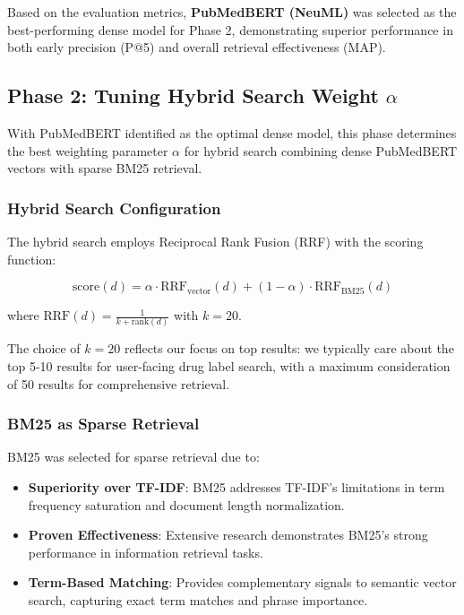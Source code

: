 Based on the evaluation metrics, \textbf{PubMedBERT (NeuML)} was selected as the best-performing dense model for Phase 2, demonstrating superior performance in both early precision (P@5) and overall retrieval effectiveness (MAP).

\subsection{Phase 2: Tuning Hybrid Search Weight \texorpdfstring{$\alpha$}{alpha}}
\label{subsec:phase2-hybrid-tuning}

With PubMedBERT identified as the optimal dense model, this phase determines the best weighting parameter \texorpdfstring{$\alpha$}{alpha} for hybrid search combining dense PubMedBERT vectors with sparse BM25 retrieval.

\subsubsection{Hybrid Search Configuration}
\label{subsubsec:hybrid-configuration}

The hybrid search employs Reciprocal Rank Fusion (RRF) with the scoring function:

\[
    \text{score}(d) = \alpha \cdot \text{RRF}_{\text{vector}}(d) + (1 - \alpha) \cdot \text{RRF}_{\text{BM25}}(d)
\]

where $\text{RRF}(d) = \frac{1}{k + \text{rank}(d)}$ with $k = 20$.

The choice of $k=20$ reflects our focus on top results: we typically care about the top 5-10 results for user-facing drug label search, with a maximum consideration of 50 results for comprehensive retrieval.

\subsubsection{BM25 as Sparse Retrieval}
\label{subsubsec:bm25-rationale}

BM25 was selected for sparse retrieval due to:
\begin{itemize}
    \item \textbf{Superiority over TF-IDF}: BM25 addresses TF-IDF's limitations in term frequency saturation and document length normalization.
    \item \textbf{Proven Effectiveness}: Extensive research demonstrates BM25's strong performance in information retrieval tasks.
    \item \textbf{Term-Based Matching}: Provides complementary signals to semantic vector search, capturing exact term matches and phrase importance.
\end{itemize}

